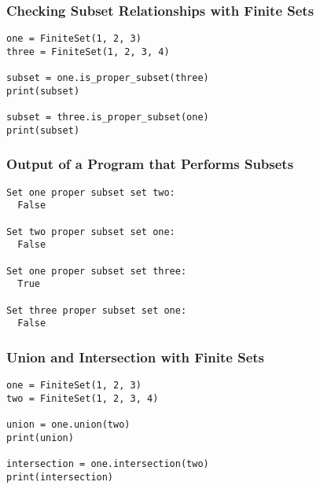 \documentclass[14pt,aspectratio=169]{beamer}
\begin{document}
%
\begin{frame}[fragile]
  \frametitle{Checking Subset Relationships with Finite Sets}
  \normalsize
  \begin{minipage}{6in}
    \vspace*{.25in}
    \begin{verbatim}
one = FiniteSet(1, 2, 3)
three = FiniteSet(1, 2, 3, 4)

subset = one.is_proper_subset(three)
print(subset)

subset = three.is_proper_subset(one)
print(subset)
    \end{verbatim}
  \end{minipage}
\end{frame}

%
\begin{frame}[fragile]
  \frametitle{Output of a Program that Performs Subsets}
  \normalsize
  \begin{minipage}{6in}
    \vspace*{.25in}
    \begin{verbatim}
Set one proper subset set two:
  False

Set two proper subset set one:
  False

Set one proper subset set three:
  True

Set three proper subset set one:
  False
    \end{verbatim}
  \end{minipage}
\end{frame}

%
\begin{frame}[fragile]
  \frametitle{Union and Intersection with Finite Sets}
  \normalsize
  \begin{minipage}{6in}
    \vspace*{.25in}
    \begin{verbatim}
one = FiniteSet(1, 2, 3)
two = FiniteSet(1, 2, 3, 4)

union = one.union(two)
print(union)

intersection = one.intersection(two)
print(intersection)
    \end{verbatim}
  \end{minipage}
\end{frame}
\end{document}
